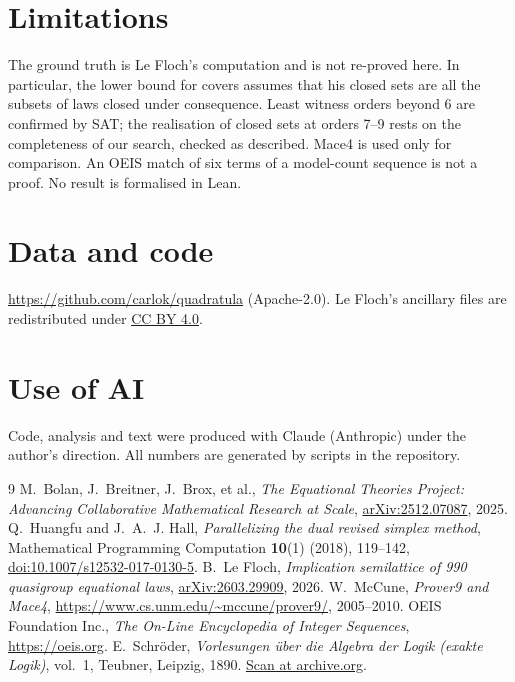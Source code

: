\documentclass[11pt,a4paper]{article}
\newcommand{\arxiv}[1]{\href{https://arxiv.org/abs/#1}{arXiv:#1}}
\newcommand{\doi}[1]{\href{https://doi.org/#1}{doi:#1}}
\newcommand{\repo}{\url{https://github.com/carlok/quadratula}}
\theoremstyle{definition}
\begin{document}
\section{Limitations}

The ground truth is Le Floch's computation and is not re-proved here. In particular,
the lower bound for covers assumes that his \NVarieties{} closed sets are all the
subsets of laws closed under consequence. Least witness orders beyond 6 are confirmed
by SAT; the realisation of closed sets at orders 7--9 rests on the completeness of our
search, checked as described. Mace4 is used only for comparison.
An OEIS match of six terms of a model-count sequence is not a proof. No result is
formalised in Lean.

\section*{Data and code}
\repo{} (Apache-2.0). Le Floch's ancillary files are redistributed under
\href{https://creativecommons.org/licenses/by/4.0/}{CC BY 4.0}.

\section*{Use of AI}
Code, analysis and text were produced with Claude (Anthropic) under the author's
direction. All numbers are generated by scripts in the repository.

\begin{thebibliography}{9}
 M.~Bolan, J.~Breitner, J.~Brox, et al., \emph{The Equational Theories
Project: Advancing Collaborative Mathematical Research at Scale}, \arxiv{2512.07087},
2025.
 Q.~Huangfu and J.~A.~J. Hall, \emph{Parallelizing the dual revised
simplex method}, Mathematical Programming Computation \textbf{10}(1) (2018),
119--142, \doi{10.1007/s12532-017-0130-5}.
 B.~Le Floch, \emph{Implication semilattice of 990 quasigroup
equational laws}, \arxiv{2603.29909}, 2026.
 W.~McCune, \emph{Prover9 and Mace4},
\url{https://www.cs.unm.edu/~mccune/prover9/}, 2005--2010.
 OEIS Foundation Inc., \emph{The On-Line Encyclopedia of Integer
Sequences}, \url{https://oeis.org}.
 E.~Schröder, \emph{Vorlesungen über die Algebra der Logik (exakte
Logik)}, vol.~1, Teubner, Leipzig, 1890.
\href{https://archive.org/details/bub_gb_P95LAAAAYAAJ}{Scan at archive.org}.
\end{thebibliography}
\end{document}
